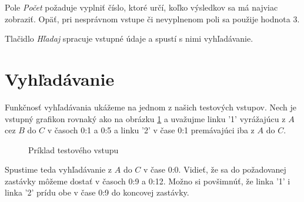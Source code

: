 Pole \textit{Počet} požaduje vyplniť číslo, ktoré určí, koľko výsledkov sa má najviac zobraziť. Opäť, pri nesprávnom vstupe či nevyplnenom poli sa použije hodnota $3$.\newline

Tlačidlo \textit{Hľadaj} spracuje vstupné údaje a spustí s nimi vyhľadávanie.\newline


\section{Vyhľadávanie}

Funkčnosť vyhľadávania ukážeme na jednom z našich testových vstupov. Nech je vstupný grafikon rovnaký ako na obrázku \ref{priklad_vstupu_softver} a uvažujme linku '1' vyrážajúcu z $A$ cez $B$ do $C$ v časoch 0:1 a 0:5 a linku '2' v čase 0:1 premávajúci iba z $A$ do $C$.\newline

\begin{figure}[H]
  \caption{Príklad testového vstupu}
  \label{priklad_vstupu_softver}
\end{figure}

Spustime teda vyhľadávanie z $A$ do $C$ v čase 0:0. Vidieť, že sa do požadovanej zastávky môžeme dostať v časoch 0:9 a 0:12. Možno si povšimnúť, že linka '1' i linka '2' prídu obe v čase 0:9 do koncovej zastávky.\newline

